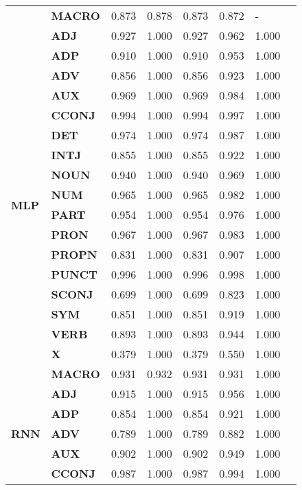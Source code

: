 \begin{longtable}{|l||l||l||l||l||l||l||l|}
\textbf{} & \textbf{MACRO} & 0.873 & 0.878 & 0.873 & 0.872 & - \\
\cline{1-7}
\multirow[t]{18}{*}{\textbf{MLP}} & \textbf{ADJ} & 0.927 & 1.000 & 0.927 & 0.962 & 1.000 \\
\textbf{} & \textbf{ADP} & 0.910 & 1.000 & 0.910 & 0.953 & 1.000 \\
\textbf{} & \textbf{ADV} & 0.856 & 1.000 & 0.856 & 0.923 & 1.000 \\
\textbf{} & \textbf{AUX} & 0.969 & 1.000 & 0.969 & 0.984 & 1.000 \\
\textbf{} & \textbf{CCONJ} & 0.994 & 1.000 & 0.994 & 0.997 & 1.000 \\
\textbf{} & \textbf{DET} & 0.974 & 1.000 & 0.974 & 0.987 & 1.000 \\
\textbf{} & \textbf{INTJ} & 0.855 & 1.000 & 0.855 & 0.922 & 1.000 \\
\textbf{} & \textbf{NOUN} & 0.940 & 1.000 & 0.940 & 0.969 & 1.000 \\
\textbf{} & \textbf{NUM} & 0.965 & 1.000 & 0.965 & 0.982 & 1.000 \\
\textbf{} & \textbf{PART} & 0.954 & 1.000 & 0.954 & 0.976 & 1.000 \\
\textbf{} & \textbf{PRON} & 0.967 & 1.000 & 0.967 & 0.983 & 1.000 \\
\textbf{} & \textbf{PROPN} & 0.831 & 1.000 & 0.831 & 0.907 & 1.000 \\
\textbf{} & \textbf{PUNCT} & 0.996 & 1.000 & 0.996 & 0.998 & 1.000 \\
\textbf{} & \textbf{SCONJ} & 0.699 & 1.000 & 0.699 & 0.823 & 1.000 \\
\textbf{} & \textbf{SYM} & 0.851 & 1.000 & 0.851 & 0.919 & 1.000 \\
\textbf{} & \textbf{VERB} & 0.893 & 1.000 & 0.893 & 0.944 & 1.000 \\
\textbf{} & \textbf{X} & 0.379 & 1.000 & 0.379 & 0.550 & 1.000 \\
\textbf{} & \textbf{MACRO} & 0.931 & 0.932 & 0.931 & 0.931 & 1.000 \\
\cline{1-7}
\multirow[t]{18}{*}{\textbf{RNN}} & \textbf{ADJ} & 0.915 & 1.000 & 0.915 & 0.956 & 1.000 \\
\textbf{} & \textbf{ADP} & 0.854 & 1.000 & 0.854 & 0.921 & 1.000 \\
\textbf{} & \textbf{ADV} & 0.789 & 1.000 & 0.789 & 0.882 & 1.000 \\
\textbf{} & \textbf{AUX} & 0.902 & 1.000 & 0.902 & 0.949 & 1.000 \\
\textbf{} & \textbf{CCONJ} & 0.987 & 1.000 & 0.987 & 0.994 & 1.000 \\

\end{longtable}

